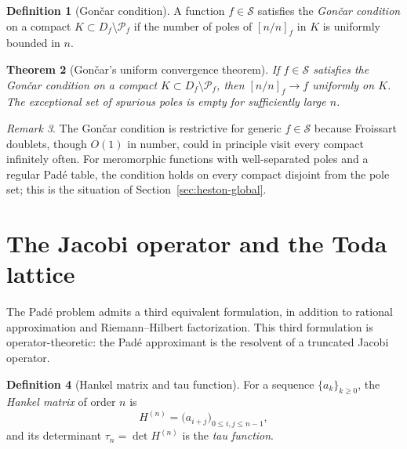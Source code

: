 \documentclass[11pt]{article}
\newtheorem{theorem}{Theorem}[section]
\theoremstyle{definition}
\newtheorem{definition}[theorem]{Definition}
\theoremstyle{remark}
\newtheorem{remark}[theorem]{Remark}
\begin{document}
\begin{definition}[Gon\v{c}ar condition]
\label{def:goncar}
A function $f\in\mathcal{S}$ satisfies the \emph{Gon\v{c}ar condition} on a compact $K\subset D_{f}\setminus\mathcal{P}_{f}$ if the number of poles of $[n/n]_{f}$ in $K$ is uniformly bounded in $n$.
\end{definition}

\begin{theorem}[Gon\v{c}ar's uniform convergence theorem]
\label{thm:goncar}
If $f\in\mathcal{S}$ satisfies the Gon\v{c}ar condition on a compact $K\subset D_{f}\setminus\mathcal{P}_{f}$, then $[n/n]_{f}\to f$ uniformly on $K$. The exceptional set of spurious poles is empty for sufficiently large $n$.
\end{theorem}

\begin{remark}
\label{rem:goncar-restrictive}
The Gon\v{c}ar condition is restrictive for generic $f\in\mathcal{S}$ because Froissart doublets, though $O(1)$ in number, could in principle visit every compact infinitely often. For meromorphic functions with well-separated poles and a regular Pad\'e table, the condition holds on every compact disjoint from the pole set; this is the situation of Section~\ref{sec:heston-global}.
\end{remark}

\section{The Jacobi operator and the Toda lattice}
\label{sec:jacobi}

The Pad\'e problem admits a third equivalent formulation, in addition to rational approximation and Riemann--Hilbert factorization. This third formulation is operator-theoretic: the Pad\'e approximant is the resolvent of a truncated Jacobi operator.

\begin{definition}[Hankel matrix and tau function]
\label{def:hankel}
For a sequence $\{a_{k}\}_{k\ge 0}$, the \emph{Hankel matrix} of order $n$ is
\begin{equation}
H^{(n)}=\bigl(a_{i+j}\bigr)_{0\le i,j\le n-1},
\label{eq:hankel}
\end{equation}
and its determinant $\tau_{n}=\det H^{(n)}$ is the \emph{tau function}.
\end{definition}
\end{document}
